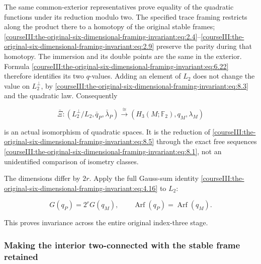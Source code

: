 The same common-exterior representatives prove equality of the quadratic functions under its reduction modulo two. The specified trace framing restricts along the product there to a homotopy of the original stable frames; \eqref{courseIII:the-original-six-dimensional-framing-invariant:eq:2.4}--\eqref{courseIII:the-original-six-dimensional-framing-invariant:eq:2.9} preserve the parity during that homotopy. The immersion and its double points are the same in the exterior. Formula \eqref{courseIII:the-original-six-dimensional-framing-invariant:eq:6.22} therefore identifies its two \(q\)-values. Adding an element of \(L_2\) does not change the value on \(L_2^\perp\), by \eqref{courseIII:the-original-six-dimensional-framing-invariant:eq:8.3} and the quadratic law. Consequently

\begin{equation}
\bar\Xi:(L_2^\perp/L_2,\bar q_P,\bar\lambda_P)
                  \xrightarrow{\ \cong\ }
       (H_3(M;\mathbb F_2),q_M,\lambda_M)
 \label{courseIII:the-original-six-dimensional-framing-invariant:eq:8.6}
\end{equation}

is an actual isomorphism of quadratic spaces. It is the reduction of \eqref{courseIII:the-original-six-dimensional-framing-invariant:eq:8.5} through the exact free sequences \eqref{courseIII:the-original-six-dimensional-framing-invariant:eq:8.1}, not an unidentified comparison of isometry classes.

The dimensions differ by \(2r\). Apply the full Gauss-sum identity \eqref{courseIII:the-original-six-dimensional-framing-invariant:eq:4.16} to \(L_2\):

\begin{equation}
G(q_P)=2^rG(q_M),\qquad
                         \operatorname{Arf}(q_P)
                              =\operatorname{Arf}(q_M).
 \label{courseIII:the-original-six-dimensional-framing-invariant:eq:8.7}
\end{equation}

This proves invariance across the entire original index-three stage.

\subsubsection{Making the interior two-connected with the stable frame retained}
\label{courseIII:the-original-six-dimensional-framing-invariant:section-8.2}


